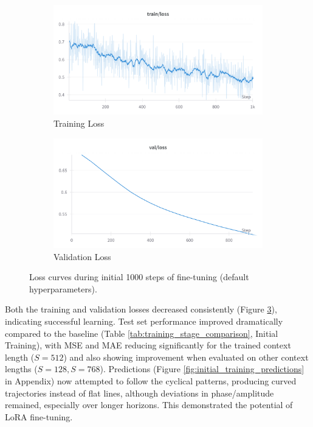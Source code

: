 \documentclass{article}
\begin{document}
\begin{figure}[!h]
    \centering
    \begin{subfigure}[b]{0.48\linewidth} \centering
        \includegraphics[width=\linewidth]{M2 Course Work//Images/initial_train_loss.png}
        \caption{Training Loss} \label{fig:initial_train_loss}
    \end{subfigure} \hfill
    \begin{subfigure}[b]{0.48\linewidth} \centering
        \includegraphics[width=\linewidth]{M2 Course Work//Images/initial_validation_loss.png}
        \caption{Validation Loss} \label{fig:initial_valid_loss}
    \end{subfigure}
    \caption{Loss curves during initial 1000 steps of fine-tuning (default hyperparameters).} %
    \label{fig:initial_loss_curves}
\end{figure}

Both the training and validation losses decreased consistently (Figure \ref{fig:initial_loss_curves}), indicating successful learning. Test set performance improved dramatically compared to the baseline (Table \ref{tab:training_stage_comparison}, Initial Training), with MSE and MAE reducing significantly for the trained context length ($S=512$) and also showing improvement when evaluated on other context lengths ($S=128, S=768$). Predictions (Figure \ref{fig:initial_training_predictions} in Appendix) now attempted to follow the cyclical patterns, producing curved trajectories instead of flat lines, although deviations in phase/amplitude remained, especially over longer horizons. This demonstrated the potential of LoRA fine-tuning.
\end{document}
